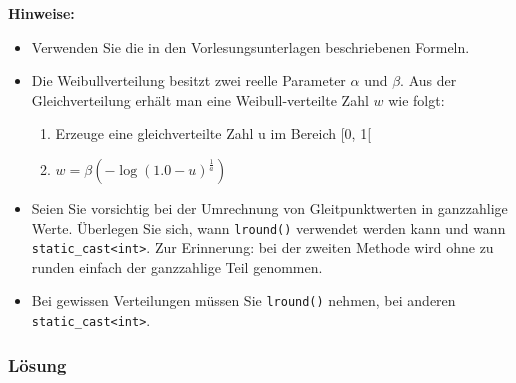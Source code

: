 \textbf{Hinweise:}
\begin{itemize}
  \item  Verwenden Sie die in den Vorlesungsunterlagen beschriebenen Formeln.
  \item Die Weibullverteilung besitzt zwei reelle Parameter $\alpha$ und $\beta$. Aus der Gleichverteilung erhält man eine Weibull-verteilte Zahl $w$ wie folgt:
  \begin{enumerate}
    \item Erzeuge eine gleichverteilte Zahl u im Bereich [0, 1[
    \item $w = \beta(-\log(1.0-u)^{\frac{1}{a}})$
  \end{enumerate}
  \item Seien Sie vorsichtig bei der Umrechnung von Gleitpunktwerten in ganzzahlige Werte. Überlegen Sie sich, wann \texttt{lround()} verwendet werden kann und wann \texttt{static\_cast<int>}. Zur Erinnerung: bei der zweiten Methode wird ohne zu runden einfach der ganzzahlige Teil genommen.
  \item Bei gewissen Verteilungen müssen Sie \texttt{lround()} nehmen, bei anderen \texttt{static\_cast<int>}.
\end{itemize}

\subsubsection{Lösung}



\noindent\makebox[\linewidth]{\rule{\paperwidth}{0.4pt}}

\noindent\makebox[\linewidth]{\rule{\paperwidth}{0.4pt}}

